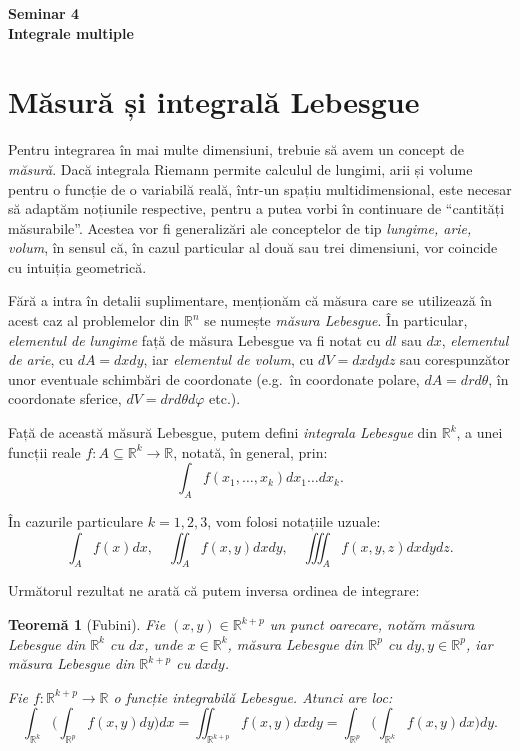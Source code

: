 \documentclass[11pt,a4paper]{article}
\newcommand\qq{\enquote}
\newcommand\seq{\subseteq}
\newcommand\RR{\mathbb{R}}
\theoremstyle{dotless}
\newtheorem{theorem}{Teorem\u{a}}[section]
\theoremstyle{dotlessdr}
\begin{document}
\begin{center}
  {\large\textbf{Seminar 4 \\ Integrale multiple}}
\end{center}

\vspace{1cm}

\section{Măsură și integrală Lebesgue}

\indent\indent Pentru integrarea în mai multe dimensiuni, trebuie să avem un concept
de \emph{măsură}. Dacă integrala Riemann permite calculul de lungimi, arii și volume
pentru o funcție de o variabilă reală, într-un spațiu multidimensional, este necesar
să adaptăm noțiunile respective, pentru a putea vorbi în continuare de \qq{cantități %
  măsurabile}. Acestea vor fi generalizări ale conceptelor de tip \emph{lungime, arie,
  volum}, în sensul că, în cazul particular al două sau trei dimensiuni, vor coincide
cu intuiția geometrică.

Fără a intra în detalii suplimentare, menționăm că măsura care se utilizează în acest
caz al problemelor din $\RR^n$ se numește \emph{măsura Lebesgue}. În particular,
\emph{elementul de lungime} față de măsura Lebesgue va fi notat cu $dl$ sau $dx$,
\emph{elementul de arie}, cu $dA = dxdy$, iar \emph{elementul de volum}, cu
$dV = dxdydz$ sau corespunzător unor eventuale schimbări de coordonate (e.g.\ în
coordonate polare, $dA = drd\theta$, în coordonate sferice, $dV = dr d\theta d\varphi$
etc.).

Față de această măsură Lebesgue, putem defini \emph{integrala Lebesgue} din $\RR^k$,
a unei funcții reale $f : A \seq \RR^k \to \RR$, notată, în general, prin:
\[
  \int_A f(x_1, \dots, x_k) dx_1 \dots dx_k.
\]

În cazurile particulare $k = 1, 2, 3$, vom folosi notațiile uzuale:
\[
  \int_A f(x) dx, \quad \iint_A f(x, y) dxdy, \quad \iiint_A f(x, y, z) dxdydz.
\]

Următorul rezultat ne arată că putem inversa ordinea de integrare:
\begin{theorem}[Fubini]\label{thm:fubini}
  Fie $(x, y) \in \RR^{k + p}$ un punct oarecare, notăm măsura Lebesgue din $\RR^k$ cu
  $dx$, unde $x \in \RR^k$, măsura Lebesgue din $\RR^p$ cu $dy, y \in \RR^p$, iar
  măsura Lebesgue din $\RR^{k + p}$ cu $dxdy$.

  Fie $f : \RR^{k + p} \to \RR$ o funcție integrabilă Lebesgue. Atunci are loc:
  \[
    \int_{\RR^k} \Bigg( \int_{\RR^p} f(x, y) dy \Bigg) dx = %
    \iint_{\RR^{k + p}} f(x, y) dxdy = %
    \int_{\RR^p} \Bigg( \int_{\RR^k} f(x, y) dx \Bigg) dy.
  \]
\end{theorem}
\end{document}

